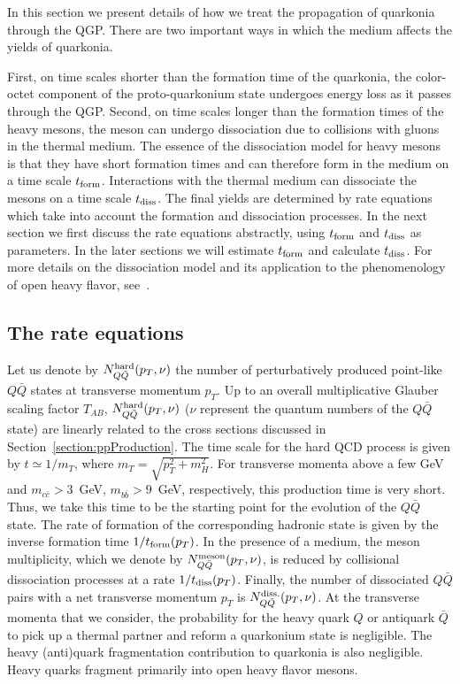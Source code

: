\documentclass[article,showpacs,preprintnumbers,amsmath,amssymb]{revtex4}
\newcommand{\barQ}{{\bar{Q}}}
\newcommand{\rf}{{\rm form}}
\newcommand{\rd}{{\rm diss}}
\begin{document}
In this section we present  details of how we treat  the propagation of quarkonia
through the QGP. There are two important ways in which the medium
affects the yields of quarkonia.

First, on time scales shorter than the formation time of the quarkonia,
the color-octet component of the proto-quarkonium state undergoes energy loss
as it passes through the QGP.  Second, on time scales longer than  the formation
times of the heavy mesons, the meson can undergo dissociation due to collisions
with gluons in the thermal medium.  The essence of the dissociation model for
heavy mesons is that they have short formation times and can therefore form in
the medium on a time scale $t_{\rm form}$. Interactions with the thermal medium
can dissociate the mesons on a time scale $t_{\rm diss}$. The final yields are
determined by rate equations which take into account the formation and
dissociation processes. In the next section we first discuss the rate equations
abstractly, using $t_\rf$ and $t_\rd$ as parameters. In the later sections we
will estimate $t_\rf$ and calculate $t_\rd$. For more details on the
dissociation model and its application to the phenomenology of open heavy
flavor, see~\cite{Sharma:2009hn}.  
  
\subsection{The rate equations}
Let us denote by $N^{\rm hard}_{Q\bar{Q}}(p_T, \nu)$ the number of
perturbatively produced  point-like $Q\bar{Q}$ states at transverse momentum
$p_T$. Up to an overall multiplicative Glauber scaling factor $T_{AB}$, $N^{\rm
hard}_{Q\bar{Q}}(p_T,\nu)$ ($\nu$ represent the quantum numbers of the $Q\barQ$
state) are linearly related to the cross sections discussed in
Section~\ref{section:ppProduction}. The time scale for the hard QCD process is
given by  $t \simeq 1/m_T$, where $m_T = \sqrt{p_T^2+m_H^2}$.  For transverse
momenta  above a few GeV and $m_{c\bar{c}}> 3$~GeV, $m_{b\bar{b}}> 9$~GeV,
respectively, this production time is very short. Thus, we take this time to be
the starting point for the evolution of the $Q\bar{Q}$ state. The rate of
formation of the corresponding hadronic state is given by the inverse formation
time $1/t_{\rm form}(p_T)$. In the presence of a medium, the meson
multiplicity, which we denote by $N^{\rm meson}_{Q\bar{Q}}(p_T,\nu)$, is
reduced by collisional dissociation processes at a rate $1/t_{\rm
diss}(p_T)$. Finally, the number of dissociated $Q\bar{Q}$ pairs with a net
transverse momentum $p_T$ is $N^{\rm diss.}_{Q\bar{Q}}(p_T,\nu)$. At the
transverse momenta that we consider, the probability for the  heavy quark $Q$
or antiquark $\bar{Q}$ to pick up a thermal partner and reform a quarkonium
state is negligible. The heavy (anti)quark fragmentation contribution to
quarkonia is also negligible. Heavy quarks fragment primarily into open heavy
flavor mesons.   
\end{document}
